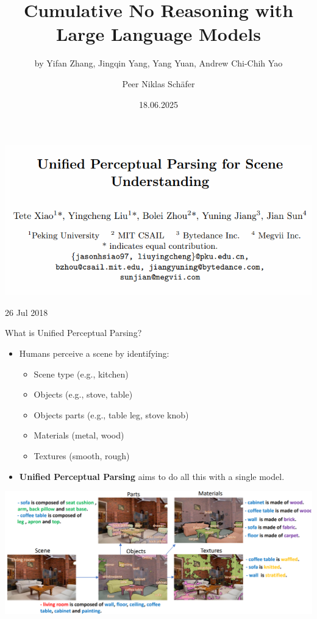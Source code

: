 \documentclass{beamer}
\title[]{Cumulative No Reasoning with Large Language Models}
\subtitle{by Yifan Zhang, Jingqin Yang, Yang Yuan, Andrew Chi-Chih Yao}
\author{Peer Niklas Schäfer}
\institute{University of Cologne}
\date{18.06.2025}
\begin{document}
\begin{frame}
    \titlepage
\end{frame}


\begin{frame}{}
    \begin{center}
        \includegraphics[width=0.8\linewidth]{Images/paper.png}

        \tiny{26 Jul 2018}
    \end{center}
\end{frame}


\begin{frame}{What is Unified Perceptual Parsing?}
    \begin{itemize}
        \item Humans perceive a scene by identifying:
        \begin{itemize}
            \item Scene type (e.g., kitchen)
            \item Objects (e.g., stove, table)
            \item Objects parts (e.g., table leg, stove knob)
            \item Materials (metal, wood)
            \item Textures (smooth, rough)
        \end{itemize}
        \item \textbf{Unified Perceptual Parsing} aims to do all this with a single model.
    \end{itemize}
    \vfill
    \begin{center}
        \includegraphics[width=0.8\linewidth]{Images/intro_segmentation.png}
    \end{center}
\end{frame}
\end{document}
